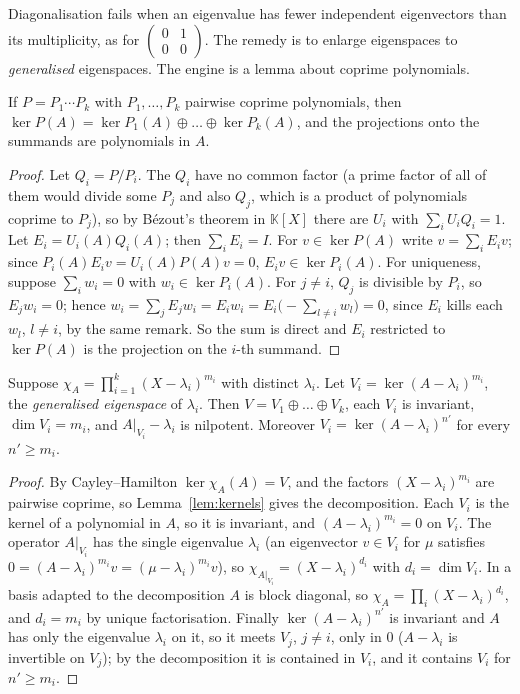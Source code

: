 Diagonalisation fails when an eigenvalue has fewer independent eigenvectors than its multiplicity, as for
$\begin{pmatrix}0&1\\0&0\end{pmatrix}$. The remedy is to enlarge eigenspaces to \emph{generalised} eigenspaces. The engine is
a lemma about coprime polynomials.

\begin{lemma}\label{lem:kernels}
If $P=P_1\cdots P_k$ with $P_1,\dots,P_k$ pairwise coprime polynomials, then
$\ker P(A)=\ker P_1(A)\oplus\dots\oplus\ker P_k(A)$, and the projections onto the summands are polynomials in $A$.
\end{lemma}
\begin{proof}
Let $Q_i=P/P_i$. The $Q_i$ have no common factor (a prime factor of all of them would divide some $P_j$ and also $Q_j$,
which is a product of polynomials coprime to $P_j$), so by B\'ezout's theorem in $\mathbb K[X]$ there are $U_i$ with
$\sum_iU_iQ_i=1$. Let $E_i=U_i(A)Q_i(A)$; then $\sum_iE_i=I$. For $v\in\ker P(A)$ write $v=\sum_iE_iv$; since
$P_i(A)E_iv=U_i(A)P(A)v=0$, $E_iv\in\ker P_i(A)$. For uniqueness, suppose $\sum_iw_i=0$ with $w_i\in\ker P_i(A)$. For $j\ne i$,
$Q_j$ is divisible by $P_i$, so $E_jw_i=0$; hence $w_i=\sum_jE_jw_i=E_iw_i=E_i\bigl(-\sum_{l\ne i}w_l\bigr)=0$, since $E_i$ kills
each $w_l$, $l\ne i$, by the same remark. So the sum is direct and $E_i$ restricted to $\ker P(A)$ is the projection on
the $i$-th summand.
\end{proof}

\begin{theorem}\label{thm:geneigen}
Suppose $\chi_A=\prod_{i=1}^k(X-\lambda_i)^{m_i}$ with distinct $\lambda_i$. Let $V_i=\ker(A-\lambda_i)^{m_i}$, the
\emph{generalised eigenspace} of $\lambda_i$. Then $V=V_1\oplus\dots\oplus V_k$, each $V_i$ is invariant, $\dim V_i=m_i$, and
$A|_{V_i}-\lambda_i$ is nilpotent. Moreover $V_i=\ker(A-\lambda_i)^{n'}$ for every $n'\ge m_i$.
\end{theorem}
\begin{proof}
By Cayley--Hamilton $\ker\chi_A(A)=V$, and the factors $(X-\lambda_i)^{m_i}$ are pairwise coprime, so Lemma~\ref{lem:kernels}
gives the decomposition. Each $V_i$ is the kernel of a polynomial in $A$, so it is invariant, and $(A-\lambda_i)^{m_i}=0$ on
$V_i$. The operator $A|_{V_i}$ has the single eigenvalue $\lambda_i$ (an eigenvector $v\in V_i$ for $\mu$ satisfies
$0=(A-\lambda_i)^{m_i}v=(\mu-\lambda_i)^{m_i}v$), so $\chi_{A|_{V_i}}=(X-\lambda_i)^{d_i}$ with $d_i=\dim V_i$. In a basis adapted to the
decomposition $A$ is block diagonal, so $\chi_A=\prod_i(X-\lambda_i)^{d_i}$, and $d_i=m_i$ by unique factorisation. Finally
$\ker(A-\lambda_i)^{n'}$ is invariant and $A$ has only the eigenvalue $\lambda_i$ on it, so it meets $V_j$, $j\ne i$, only in
$0$ ($A-\lambda_i$ is invertible on $V_j$); by the decomposition it is contained in $V_i$, and it contains $V_i$ for $n'\ge
m_i$.
\end{proof}

